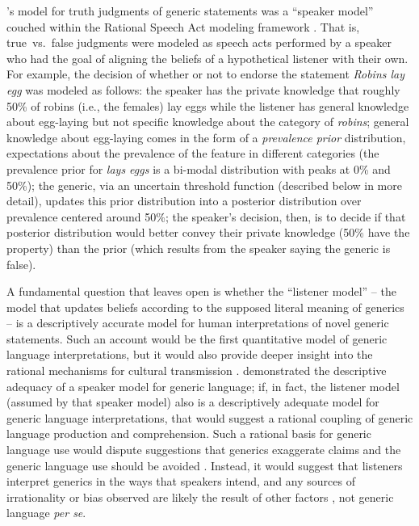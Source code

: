 \documentclass[floatsintext,doc]{apa6}
\begin{document}
's model for truth judgments of generic statements was a ``speaker model'' couched within the Rational Speech Act modeling framework \cite{Frank2012, Goodman2013, Goodman2016, problang}. That is, true~vs.~false judgments were modeled as speech acts performed by a speaker who had the goal of aligning the beliefs of a hypothetical listener with their own. For example, the decision of whether or not to endorse the statement \textit{Robins lay egg} was modeled as follows: the speaker has the private knowledge that roughly 50\% of robins (i.e., the females) lay eggs while the listener has general knowledge about egg-laying but not specific knowledge about the category of \textit{robins}; general knowledge about egg-laying comes in the form of a \textit{prevalence prior} distribution, expectations about the prevalence of the feature in different categories (the prevalence prior for \textit{lays eggs} is a bi-modal distribution with peaks at 0\% and 50\%); the generic, via an uncertain threshold function (described below in more detail), updates this prior distribution into a posterior distribution over prevalence centered around 50\%; the speaker's decision, then, is to decide if that posterior distribution would better convey their private knowledge (50\% have the property) than the prior (which results from the speaker saying the generic is false). 

A fundamental question that  leaves open is whether the ``listener model'' -- the model that updates beliefs according to the supposed literal meaning of generics -- is a descriptively accurate model for human interpretations of novel generic statements. Such an account would be the first quantitative model of generic language interpretations, but it would also provide deeper insight into the rational mechanisms for cultural transmission \cite{Tomasello1999}.  demonstrated the descriptive adequacy of a speaker model for generic language; if, in fact, the listener model (assumed by that speaker model) also is a descriptively adequate model for generic language interpretations, that would suggest a rational coupling of generic language production and comprehension. Such a rational basis for generic language use would dispute suggestions that generics exaggerate claims \cite{Cimpian2010} and the generic language use should be avoided \cite{leslie2017original}. Instead, it would suggest that listeners interpret generics in the ways that speakers intend, and any sources of irrationality or bias observed are likely the result of other factors \cite{saul2017generics, hoicka2021language}, not generic language \textit{per se}.
\end{document}

